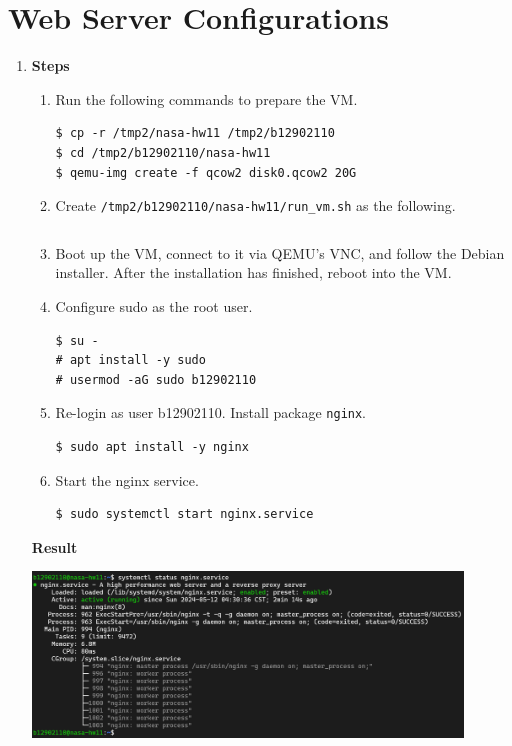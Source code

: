 \documentclass[12pt, a4paper]{article}
\begin{document}
  \section*{Web Server Configurations}
  \begin{enumerate}[resume]
    \item \textbf{Steps}
    \begin{enumerate}[label=(\arabic*)]
      \item Run the following commands to prepare the VM.
      \begin{Verbatim}[frame=single]
$ cp -r /tmp2/nasa-hw11 /tmp2/b12902110
$ cd /tmp2/b12902110/nasa-hw11
$ qemu-img create -f qcow2 disk0.qcow2 20G
      \end{Verbatim}
      \item Create \verb|/tmp2/b12902110/nasa-hw11/run_vm.sh| as the following.
      \inputminted[fontsize=\scriptsize]{shell}{run_vm.sh}
      \item Boot up the VM, connect to it via QEMU's VNC, and follow the Debian installer. After the installation has finished, reboot into the VM.
      \item Configure sudo as the root user.
      \begin{Verbatim}[frame=single]
$ su -
# apt install -y sudo
# usermod -aG sudo b12902110
      \end{Verbatim}
      \item Re-login as user b12902110. Install package \verb|nginx|.
      \begin{Verbatim}[frame=single]
$ sudo apt install -y nginx
      \end{Verbatim}
      \item Start the nginx service.
      \begin{Verbatim}[frame=single]
$ sudo systemctl start nginx.service
      \end{Verbatim}
    \end{enumerate}

    \textbf{Result}

    \includegraphics[width=0.9\textwidth]{6_result.png}


\end{enumerate}
\end{document}
